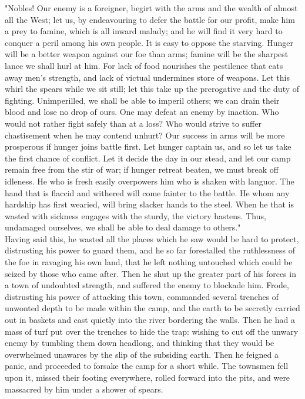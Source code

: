 \documentclass[10pt,a4paper]{report}
\begin{document}
"Nobles! Our enemy is a foreigner, begirt with the arms and the wealth of almost all the West; let us, by endeavouring to defer the battle for our profit, make him a prey to famine, which is all inward malady; and he will find it very hard to conquer a peril among his own people. It is easy to oppose the starving. Hunger will be a better weapon against our foe than arms; famine will be the sharpest lance we shall hurl at him. For lack of food nourishes the pestilence that eats away men's strength, and lack of victual undermines store of weapons. Let this whirl the spears while we sit still; let this take up the prerogative and the duty of fighting. Unimperilled, we shall be able to imperil others; we can drain their blood and lose no drop of ours. One may defeat an enemy by inaction. Who would not rather fight safely than at a loss? Who would strive to suffer chastisement when he may contend unhurt? Our success in arms will be more prosperous if hunger joins battle first. Let hunger captain us, and so let us take the first chance of conflict. Let it decide the day in our stead, and let our camp remain free from the stir of war; if hunger retreat beaten, we must break off idleness. He who is fresh easily overpowers him who is shaken with languor. The hand that is flaccid and withered will come fainter to the battle. He whom any hardship has first wearied, will bring slacker hands to the steel. When he that is wasted with sickness engages with the sturdy, the victory hastens. Thus, undamaged ourselves, we shall be able to deal damage to others."\\

Having said this, he wasted all the places which he saw would be hard to protect, distrusting his power to guard them, and he so far forestalled the ruthlessness of the foe in ravaging his own land, that he left nothing untouched which could be seized by those who came after. Then he shut up the greater part of his forces in a town of undoubted strength, and suffered the enemy to blockade him. Frode, distrusting his power of attacking this town, commanded several trenches of unwonted depth to be made within the camp, and the earth to be secretly carried out in baskets and cast quietly into the river bordering the walls. Then he had a mass of turf put over the trenches to hide the trap: wishing to cut off the unwary enemy by tumbling them down headlong, and thinking that they would be overwhelmed unawares by the slip of the subsiding earth. Then he feigned a panic, and proceeded to forsake the camp for a short while. The townsmen fell upon it, missed their footing everywhere, rolled forward into the pits, and were massacred by him under a shower of spears.\\
\end{document}
